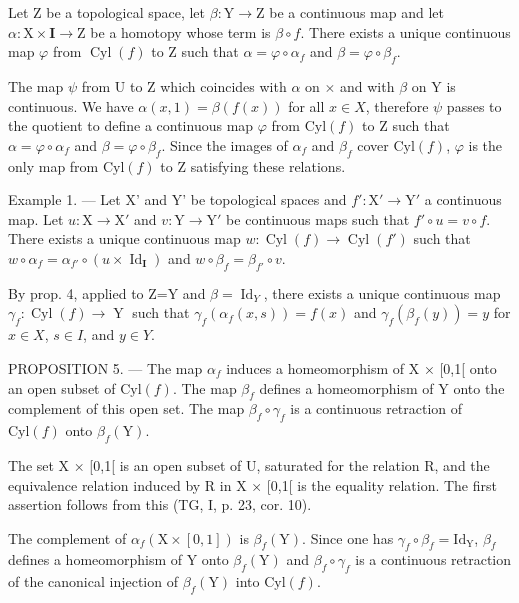 Let Z be a topological space, let \(\beta: \mathrm{Y} \to \mathrm{Z}\) be a continuous map and let \(\alpha: \mathrm{X} \times \mathbf{I} \to \mathrm{Z}\) be a homotopy whose term is \(\beta \circ f\). There exists a unique continuous map \(\varphi\) from \(\operatorname{Cyl}(f)\) to Z such that \(\alpha = \varphi \circ \alpha_f\) and \(\beta = \varphi \circ \beta_f\).

The map \(\psi\) from U to Z which coincides with \(\alpha\) on \(\times\) and with \(\beta\) on Y is continuous. We have \(\alpha(x,1)=\beta(f(x))\) for all \(x\in X\), therefore \(\psi\) passes to the quotient to define a continuous map \(\varphi\) from \(\mathrm{Cyl}(f)\) to Z such that \(\alpha=\varphi\circ\alpha_{f}\) and \(\beta=\varphi\circ\beta_{f}\). Since the images of \(\alpha_{f}\) and \(\beta_{f}\) cover \(\mathrm{Cyl}(f)\), \(\varphi\) is the only map from \(\mathrm{Cyl}(f)\) to Z satisfying these relations.

Example 1. --- Let X' and Y' be topological spaces and \(f': \mathrm{X}' \to \mathrm{Y}'\) a continuous map. Let \(u: \mathrm{X} \to \mathrm{X}'\) and \(v: \mathrm{Y} \to \mathrm{Y}'\) be continuous maps such that \(f' \circ u = v \circ f\). There exists a unique continuous map \(w: \operatorname{Cyl}(f) \to \operatorname{Cyl}(f')\) such that \(w \circ \alpha_f = \alpha_{f'} \circ (u \times \operatorname{Id}_\mathbf{I})\) and \(w \circ \beta_f = \beta_{f'} \circ v\).

By prop. 4, applied to Z=Y and \(\beta = \operatorname{Id}_{Y}\), there exists a unique continuous map \(\gamma_{f}\colon\operatorname{Cyl}(f)\to\operatorname{Y}\) such that \(\gamma_{f}(\alpha_{f}(x,s))=f(x)\) and \(\gamma_{f}(\beta_{f}(y))=y\) for \(x\in X\), \(s\in I\), and \(y\in Y\).

PROPOSITION 5. --- The map \(\alpha_{f}\) induces a homeomorphism of X × {[}0,1{[} onto an open subset of \(\mathrm{Cyl}(f)\). The map \(\beta_{f}\) defines a homeomorphism of Y onto the complement of this open set. The map \(\beta_{f} \circ \gamma_{f}\) is a continuous retraction of \(\mathrm{Cyl}(f)\) onto \(\beta_{f}(\mathrm{Y})\).

The set X × {[}0,1{[} is an open subset of U, saturated for the relation R, and the equivalence relation induced by R in X × {[}0,1{[} is the equality relation. The first assertion follows from this (TG, I, p. 23, cor. 10).

The complement of \(\alpha_{f}(\mathrm{X}\times[0,1])\) is \(\beta_{f}(\mathrm{Y})\). Since one has \(\gamma_{f}\circ\beta_{f}=\mathrm{Id}_{\mathrm{Y}}\), \(\beta_{f}\) defines a homeomorphism of Y onto \(\beta_{f}(\mathrm{Y})\) and \(\beta_{f}\circ\gamma_{f}\) is a continuous retraction of the canonical injection of \(\beta_{f}(\mathrm{Y})\) into \(\mathrm{Cyl}(f)\).

